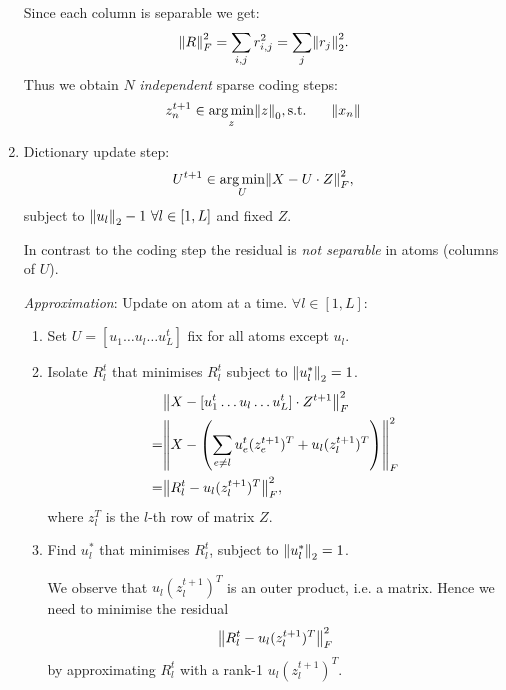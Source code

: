 \begin{enumerate}
        Since each column is separable we get:
        \begin{align*}
            \norm{R}_F^2 = \sum_{i,j} r_{i,j}^2 = \sum_j \norm{r_j}_2^2.
        \end{align*}
        Thus we obtain $N$ \emph{independent} sparse coding steps:
        \begin{align*}
            z_n^{t+1} &\in \argmin_z \norm{z}_0,
            \text{s.t. }\ &\norm{x_n}
        \end{align*}


    \item Dictionary update step:
        \begin{align*}
            U^{t+1} \in \argmin_U \norm{X-U\cdot Z}_F^2,
        \end{align*}
        subject to $\left\lVert u_l\right\rVert_2 - 1\ \forall l\in[1,L]$ and fixed $Z$.
        
        In contrast to the coding step the residual is \emph{not separable} in atoms (columns of $U$).
        
        \emph{Approximation}: Update on atom at a time. $\forall l\in[1,L]$:
        \begin{enumerate}
            \item Set $U = [u_1\ldots u_l\ldots u_L^t]$ fix for all atoms except $u_l$.
            \item Isolate $R_l^t$ that minimises $R_l^t$ subject to $\left\lVert u_l^*\right\rVert_2 =1$.
                \begin{align*}
                    &\norm{X-[u_1^t\ldots u_l \ldots u_L^t]\cdot Z^{t+1}}_F^2\\
                    =&\norm{
                        X-\left(
                                \sum_{e\neq l} u_e^t (z_e^{t+1})^T + u_l (z_l^{t+1})^T
                            \right) 
                    }_F^2\\
                    =& \norm{R_l^t - u_l (z_l^{t+1})^T}_F^2,
                \end{align*}
                where $z_l^T$ is the $l$-th row of matrix $Z$.
            \item Find $u_l^*$ that minimises $R_l^t$, subject to $\left\lVert u_l^*\right\rVert_2 = 1$.
                
                We observe that $u_l(z_l^{t+1})^T$ is an outer product, i.e. a matrix.
                Hence we need to minimise the residual
                \begin{align*}
                    \left\lVert R_l^t - u_l (z_l^{t+1})^T\right\rVert_F^2
                \end{align*}
                by approximating $R_l^t$ with a rank-1 $u_l (z_l^{t+1})^T$.
                

\end{enumerate}
\end{enumerate}
